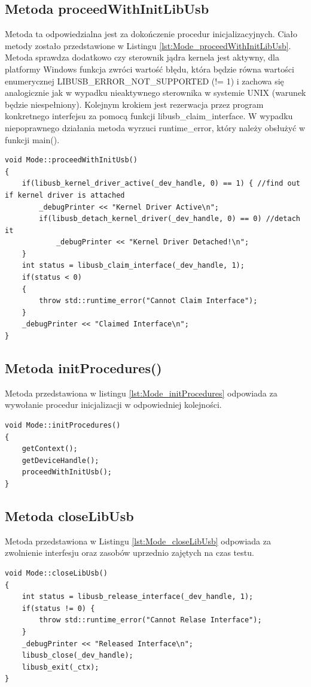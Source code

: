\documentclass{BscUS}
\begin{document}
\subsection{Metoda proceedWithInitLibUsb}
Metoda ta odpowiedzialna jest za dokończenie procedur inicjalizacyjnych. Ciało metody zostało przedstawione w Listingu \ref{lst:Mode_proceedWithInitLibUsb}. Metoda sprawdza dodatkowo czy sterownik jądra kernela jest aktywny, dla platformy Windows funkcja zwróci wartość błędu, która będzie równa wartości enumerycznej LIBUSB\_ERROR\_NOT\_SUPPORTED (!= 1) i zachowa się analogicznie jak w wypadku nieaktywnego sterownika w systemie UNIX (warunek będzie niespełniony).
\newline
Kolejnym krokiem jest rezerwacja przez program konkretnego interfejsu za pomocą funkcji libusb\_claim\_interface.
\newline
W wypadku niepoprawnego działania metoda wyrzuci runtime\_error, który należy obsłużyć  w funkcji main().
\begin{lstlisting}[caption={Metoda Mode::proceedWithInitLibUsb()},label={lst:Mode_proceedWithInitLibUsb}]
void Mode::proceedWithInitUsb()
{
	if(libusb_kernel_driver_active(_dev_handle, 0) == 1) { //find out if kernel driver is attached
		_debugPrinter << "Kernel Driver Active\n";
		if(libusb_detach_kernel_driver(_dev_handle, 0) == 0) //detach it
			_debugPrinter << "Kernel Driver Detached!\n";
	}
	int status = libusb_claim_interface(_dev_handle, 1);
	if(status < 0) 
	{
		throw std::runtime_error("Cannot Claim Interface");
	}
	_debugPrinter << "Claimed Interface\n";
}
\end{lstlisting}

\subsection{Metoda initProcedures()}
Metoda przedstawiona w listingu \ref{lst:Mode_initProcedures} odpowiada za wywołanie procedur inicjalizacji w odpowiedniej kolejności.
\begin{lstlisting}[caption={Metoda Mode::initProcedures()},label={lst:Mode_initProcedures}]
void Mode::initProcedures()
{
	getContext(); 
	getDeviceHandle();
	proceedWithInitUsb();
}
\end{lstlisting}
\subsection{Metoda closeLibUsb}
Metoda przedstawiona w Listingu \ref{lst:Mode_closeLibUsb} odpowiada za zwolnienie interfesju oraz zasobów uprzednio zajętych na czas testu.
\begin{lstlisting}[caption={Metoda Mode::closeLibUsb()},label={lst:Mode_closeLibUsb}]
void Mode::closeLibUsb()
{
	int status = libusb_release_interface(_dev_handle, 1); 
	if(status != 0) {
		throw std::runtime_error("Cannot Relase Interface");
	}
	_debugPrinter << "Released Interface\n";
	libusb_close(_dev_handle);
	libusb_exit(_ctx); 
}
\end{lstlisting}
\end{document}
